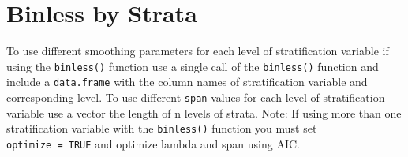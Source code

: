 \documentclass[
]{book}
\newenvironment{Shaded}{\begin{snugshade}}{\end{snugshade}}
\newcommand{\DataTypeTok}[1]{\textcolor[rgb]{0.13,0.29,0.53}{#1}}
\newcommand{\DecValTok}[1]{\textcolor[rgb]{0.00,0.00,0.81}{#1}}
\newcommand{\FloatTok}[1]{\textcolor[rgb]{0.00,0.00,0.81}{#1}}
\newcommand{\KeywordTok}[1]{\textcolor[rgb]{0.13,0.29,0.53}{\textbf{#1}}}
\newcommand{\NormalTok}[1]{#1}
\newcommand{\OperatorTok}[1]{\textcolor[rgb]{0.81,0.36,0.00}{\textbf{#1}}}
\newcommand{\OtherTok}[1]{\textcolor[rgb]{0.56,0.35,0.01}{#1}}
\newcommand{\StringTok}[1]{\textcolor[rgb]{0.31,0.60,0.02}{#1}}
\begin{document}
\hypertarget{binless-by-strata}{%
\section{Binless by Strata}\label{binless-by-strata}}

To use different smoothing parameters for each level of stratification variable if using the \texttt{binless()} function use a single call of the \texttt{binless()} function and include a \texttt{data.frame} with the column names of stratification variable and corresponding level. To use different \texttt{span} values for each level of stratification variable use a vector the length of n levels of strata. Note: If using more than one stratification variable with the \texttt{binless()} function you must set \texttt{optimize\ =\ TRUE} and optimize lambda and span using AIC.

\begin{Shaded}
\end{Shaded}
\end{document}
